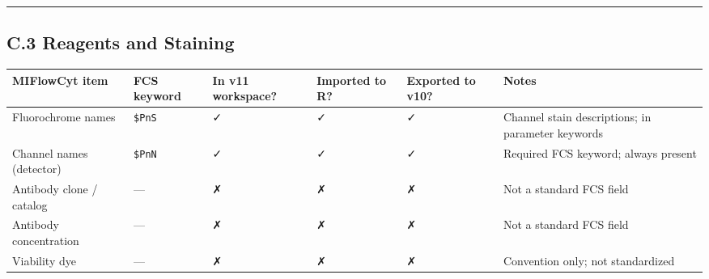 \documentclass[
]{article}
\begin{document}
\begin{center}\rule{0.5\linewidth}{0.5pt}\end{center}

\subsection{C.3 Reagents and Staining}\label{c.3-reagents-and-staining}

\begin{longtable}[]{@{}
  >{\raggedright\arraybackslash}p{}
  >{\raggedright\arraybackslash}p{}
  >{\raggedright\arraybackslash}p{}
  >{\raggedright\arraybackslash}p{}
  >{\raggedright\arraybackslash}p{}
  >{\raggedright\arraybackslash}p{}@{}}
\toprule\noalign{}
\begin{minipage}[b]{\linewidth}\raggedright
MIFlowCyt item
\end{minipage} & \begin{minipage}[b]{\linewidth}\raggedright
FCS keyword
\end{minipage} & \begin{minipage}[b]{\linewidth}\raggedright
In v11 workspace?
\end{minipage} & \begin{minipage}[b]{\linewidth}\raggedright
Imported to R?
\end{minipage} & \begin{minipage}[b]{\linewidth}\raggedright
Exported to v10?
\end{minipage} & \begin{minipage}[b]{\linewidth}\raggedright
Notes
\end{minipage} \\
\midrule\noalign{}
\endhead
\bottomrule\noalign{}
\endlastfoot
Fluorochrome names & \texttt{\$PnS} & ✓ & ✓ & ✓ & Channel stain
descriptions; in parameter keywords \\
Channel names (detector) & \texttt{\$PnN} & ✓ & ✓ & ✓ & Required FCS
keyword; always present \\
Antibody clone / catalog & --- & ✗ & ✗ & ✗ & Not a standard FCS field \\
Antibody concentration & --- & ✗ & ✗ & ✗ & Not a standard FCS field \\
Viability dye & --- & ✗ & ✗ & ✗ & Convention only; not standardized \\
\end{longtable}
\end{document}
